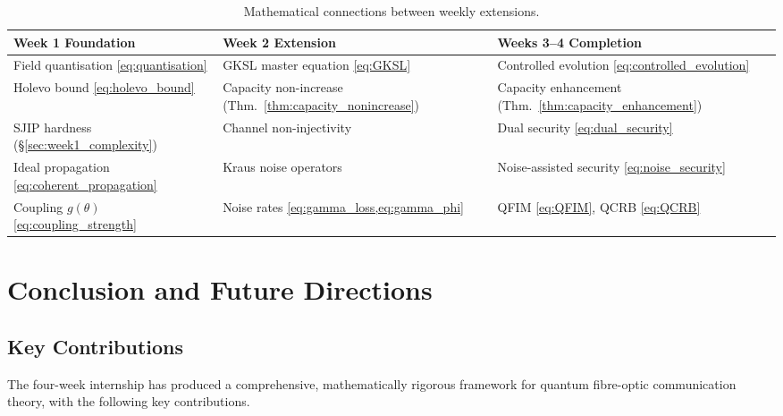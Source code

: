 \documentclass[12pt,a4paper]{article}
\theoremstyle{definition}
\theoremstyle{plain}
\begin{document}
\begin{table}[H]
\centering
\caption{Mathematical connections between weekly extensions.}
\renewcommand{\arraystretch}{1.4}
\begin{tabular}{p{4cm}p{4cm}p{4.5cm}}
\toprule
\textbf{Week 1 Foundation} & \textbf{Week 2 Extension} & \textbf{Weeks 3--4 Completion} \\
\midrule
Field quantisation \cref{eq:quantisation} & GKSL master equation \cref{eq:GKSL} & Controlled evolution \cref{eq:controlled_evolution} \\
Holevo bound \cref{eq:holevo_bound} & Capacity non-increase (Thm.~\ref{thm:capacity_nonincrease}) & Capacity enhancement (Thm.~\ref{thm:capacity_enhancement}) \\
SJIP hardness (\S\ref{sec:week1_complexity}) & Channel non-injectivity & Dual security \cref{eq:dual_security} \\
Ideal propagation \cref{eq:coherent_propagation} & Kraus noise operators & Noise-assisted security \cref{eq:noise_security} \\
Coupling $g(\theta)$ \cref{eq:coupling_strength} & Noise rates \cref{eq:gamma_loss,eq:gamma_phi} & QFIM \cref{eq:QFIM}, QCRB \cref{eq:QCRB} \\
\bottomrule
\end{tabular}
\end{table}

\section{Conclusion and Future Directions}

\subsection{Key Contributions}

The four-week internship has produced a comprehensive, mathematically rigorous framework
for quantum fibre-optic communication theory, with the following key contributions.
\end{document}
